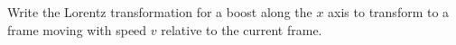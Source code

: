 

\vspace*{\fill}
\centering

Write the Lorentz transformation for a boost along the $x$ axis to transform to a frame moving with speed $v$ relative to the current frame.

\centering
\vspace*{\fill}


